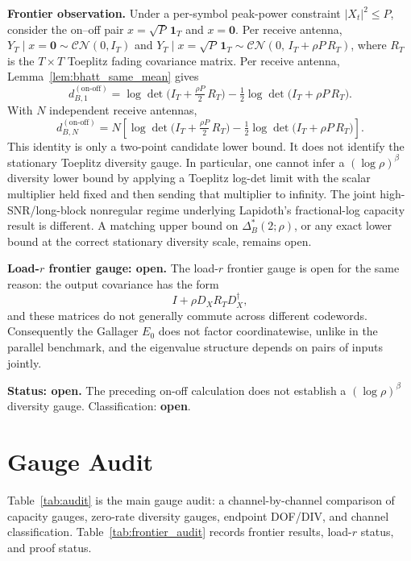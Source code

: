 \documentclass[lettersize,onecolumn]{IEEEtran}
\newcommand{\snr}{\rho}
\begin{document}
\textbf{Frontier observation.}
Under a per-symbol peak-power constraint $|X_t|^2 \le P$,
consider the on--off pair $x = \sqrt{P}\,\mathbf{1}_T$ and
$x = \mathbf{0}$. Per receive antenna,
$Y_T \mid x=\mathbf{0} \sim \mathcal{CN}(0,I_T)$ and
$Y_T \mid x=\sqrt{P}\,\mathbf{1}_T \sim
\mathcal{CN}(0,\,I_T + \snr P\,R_T)$,
where $R_T$ is the $T\times T$ Toeplitz fading covariance matrix.
Per receive antenna, Lemma~\ref{lem:bhatt_same_mean} gives
\[
d_{B,1}^{(\text{on-off})}
= \log\det\!\Big(I_T + \tfrac{\snr P}{2}\,R_T\Big)
  - \tfrac{1}{2}\log\det\!\big(I_T + \snr P\,R_T\big).
\]
With $N$ independent receive antennas,
\[
d_{B,N}^{(\text{on-off})}
= N\!\left[\log\det\!\Big(I_T + \tfrac{\snr P}{2}\,R_T\Big)
  - \tfrac{1}{2}\log\det\!\big(I_T + \snr P\,R_T\big)\right].
\]
This identity is only a two-point candidate lower bound. It does
not identify the stationary Toeplitz diversity gauge. In particular,
one cannot infer a $(\log\snr)^\beta$ diversity lower bound by
applying a Toeplitz log-det limit with the scalar multiplier held
fixed and then sending that multiplier to infinity. The joint high-SNR/long-block nonregular regime
underlying Lapidoth's fractional-log capacity result is different.
A matching upper bound on $\Delta_B^*(2;\snr)$, or any exact lower
bound at the correct stationary diversity scale, remains open.

\textbf{Load-$r$ frontier gauge: open.}
The load-$r$ frontier gauge is open for the same reason: the output covariance has the
form
\[
    I+\snr D_X R_T D_X^\dagger,
\]
and these matrices do not generally commute across different
codewords. Consequently the Gallager $E_0$ does not factor
coordinatewise, unlike in the parallel benchmark, and the eigenvalue
structure depends on pairs of inputs jointly.

\textbf{Status: open.} The preceding on-off calculation does not
establish a $(\log\snr)^\beta$ diversity gauge. Classification:
\textbf{open}.

\section{Gauge Audit}\label{sec:audit}

Table~\ref{tab:audit} is the main gauge audit: a channel-by-channel
comparison of capacity gauges, zero-rate diversity gauges, endpoint
DOF/DIV, and channel classification. Table~\ref{tab:frontier_audit}
records frontier results, load-$r$ status, and proof status.
\end{document}
